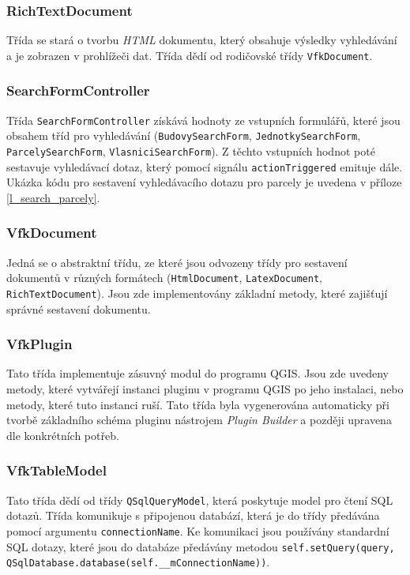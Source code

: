 \documentclass[a4paper,12pt,oneside]{book}
\begin{document}
\subsubsection{RichTextDocument}
Třída se stará o tvorbu \textit{HTML} dokumentu, který obsahuje výsledky vyhledávání a je zobrazen v prohlížeči dat. Třída dědí od rodičovské třídy \texttt{VfkDocument}. 

\subsubsection{SearchFormController}
Třída \texttt{SearchFormController} získává hodnoty ze vstupních formulářů, které jsou obsahem tříd pro vyhledávání  (\texttt{BudovySearchForm}, \texttt{JednotkySearchForm}, \texttt{Par\-celySearchForm}, \texttt{VlasniciSearchForm}). Z těchto vstupních hodnot poté sestavuje vyhledávací dotaz, který pomocí signálu \texttt{actionTriggered} emituje dále. Ukázka kódu pro sestavení vyhledávacího dotazu pro parcely je uvedena v příloze \ref{l_search_parcely}.

\subsubsection{VfkDocument}
\label{l_vfkDocument}
Jedná se o abstraktní třídu, ze které jsou odvozeny třídy pro sestavení dokumentů v různých formátech (\texttt{HtmlDocument}, \texttt{LatexDocument}, \texttt{RichTextDocument}). Jsou zde implementovány základní metody, které zajišťují správné sestavení dokumentu.

\subsubsection{VfkPlugin}
Tato třída implementuje zásuvný modul do programu QGIS. Jsou zde uvedeny metody, které vytvářejí instanci pluginu v programu QGIS po jeho instalaci, nebo metody, které tuto instanci ruší. Tato třída byla vygenerována automaticky při tvorbě základního schéma pluginu nástrojem \textit{Plugin Builder} a později upravena dle konkrétních potřeb.

\subsubsection{VfkTableModel}
Tato třída dědí od třídy \texttt{QSqlQueryModel}, která poskytuje model pro čtení SQL dotazů. Třída komunikuje s připojenou databází, která je do třídy předávána pomocí argumentu \texttt{connectionName}. Ke komunikaci jsou používány standardní SQL dotazy, které jsou do databáze předávány metodou \texttt{self.setQuery(query, QSqlDatabase.database(self.\_\_mConnectionName))}.
\end{document}
